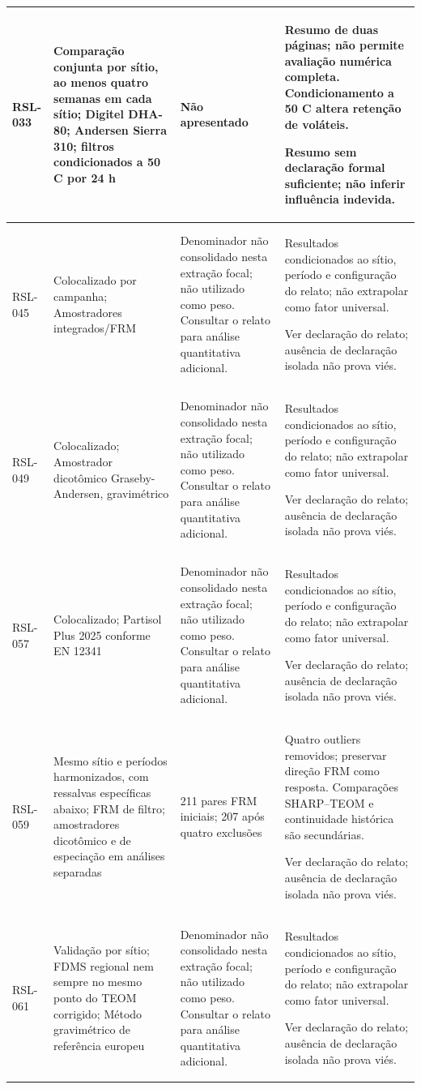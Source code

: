 \begin{longtable}{|P{0.12\textwidth}|P{0.28\textwidth}|P{0.28\textwidth}|P{\arrayrulewidth\relax}|}
RSL-033 & Comparação conjunta por sítio, ao menos quatro semanas em cada sítio; Digitel DHA-80; Andersen Sierra 310; filtros condicionados a 50 \textdegree{}C por 24 h & Não apresentado & Resumo de duas páginas; não permite avaliação numérica completa. Condicionamento a 50 \textdegree{}C altera retenção de voláteis.\par\medskip Resumo sem declaração formal suficiente; não inferir influência indevida.\\\hline
RSL-045 & Colocalizado por campanha; Amostradores integrados/FRM & Denominador não consolidado nesta extração focal; não utilizado como peso. Consultar o relato para análise quantitativa adicional. & Resultados condicionados ao sítio, período e configuração do relato; não extrapolar como fator universal.\par\medskip Ver declaração do relato; ausência de declaração isolada não prova viés.\\\hline
RSL-049 & Colocalizado; Amostrador dicotômico Graseby-Andersen, gravimétrico & Denominador não consolidado nesta extração focal; não utilizado como peso. Consultar o relato para análise quantitativa adicional. & Resultados condicionados ao sítio, período e configuração do relato; não extrapolar como fator universal.\par\medskip Ver declaração do relato; ausência de declaração isolada não prova viés.\\\hline
RSL-057 & Colocalizado; Partisol Plus 2025 conforme EN 12341 & Denominador não consolidado nesta extração focal; não utilizado como peso. Consultar o relato para análise quantitativa adicional. & Resultados condicionados ao sítio, período e configuração do relato; não extrapolar como fator universal.\par\medskip Ver declaração do relato; ausência de declaração isolada não prova viés.\\\hline
RSL-059 & Mesmo sítio e períodos harmonizados, com ressalvas específicas abaixo; FRM de filtro; amostradores dicotômico e de especiação em análises separadas & 211 pares FRM iniciais; 207 após quatro exclusões & Quatro outliers removidos; preservar direção FRM como resposta. Comparações SHARP--TEOM e continuidade histórica são secundárias.\par\medskip Ver declaração do relato; ausência de declaração isolada não prova viés.\\\hline
RSL-061 & Validação por sítio; FDMS regional nem sempre no mesmo ponto do TEOM corrigido; Método gravimétrico de referência europeu & Denominador não consolidado nesta extração focal; não utilizado como peso. Consultar o relato para análise quantitativa adicional. & Resultados condicionados ao sítio, período e configuração do relato; não extrapolar como fator universal.\par\medskip Ver declaração do relato; ausência de declaração isolada não prova viés.\\\hline

\end{longtable}
